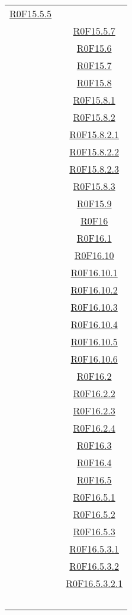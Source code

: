 \documentclass[../AnalisiDeiRequisiti.tex]{subfiles}
\begin{document}
\begin{longtable}{|c|c|}
	\hyperlink{R0F15.5.5}{R0F15.5.5}\\& \
	\hyperlink{R0F15.5.7}{R0F15.5.7}\\& \
	\hyperlink{R0F15.6}{R0F15.6}\\& \
	\hyperlink{R0F15.7}{R0F15.7}\\& \
	\hyperlink{R0F15.8}{R0F15.8}\\& \
	\hyperlink{R0F15.8.1}{R0F15.8.1}\\& \
	\hyperlink{R0F15.8.2}{R0F15.8.2}\\& \
	\hyperlink{R0F15.8.2.1}{R0F15.8.2.1}\\& \
	\hyperlink{R0F15.8.2.2}{R0F15.8.2.2}\\& \
	\hyperlink{R0F15.8.2.3}{R0F15.8.2.3}\\& \
	\hyperlink{R0F15.8.3}{R0F15.8.3}\\& \
	\hyperlink{R0F15.9}{R0F15.9}\\& \
	\hyperlink{R0F16}{R0F16}\\& \
	\hyperlink{R0F16.1}{R0F16.1}\\& \
	\hyperlink{R0F16.10}{R0F16.10}\\& \
	\hyperlink{R0F16.10.1}{R0F16.10.1}\\& \
	\hyperlink{R0F16.10.2}{R0F16.10.2}\\& \
	\hyperlink{R0F16.10.3}{R0F16.10.3}\\& \
	\hyperlink{R0F16.10.4}{R0F16.10.4}\\& \
	\hyperlink{R0F16.10.5}{R0F16.10.5}\\& \
	\hyperlink{R0F16.10.6}{R0F16.10.6}\\& \
	\hyperlink{R0F16.2}{R0F16.2}\\& \
	\hyperlink{R0F16.2.2}{R0F16.2.2}\\& \
	\hyperlink{R0F16.2.3}{R0F16.2.3}\\& \
	\hyperlink{R0F16.2.4}{R0F16.2.4}\\& \
	\hyperlink{R0F16.3}{R0F16.3}\\& \
	\hyperlink{R0F16.4}{R0F16.4}\\& \
	\hyperlink{R0F16.5}{R0F16.5}\\& \
	\hyperlink{R0F16.5.1}{R0F16.5.1}\\& \
	\hyperlink{R0F16.5.2}{R0F16.5.2}\\& \
	\hyperlink{R0F16.5.3}{R0F16.5.3}\\& \
	\hyperlink{R0F16.5.3.1}{R0F16.5.3.1}\\& \
	\hyperlink{R0F16.5.3.2}{R0F16.5.3.2}\\& \
	\hyperlink{R0F16.5.3.2.1}{R0F16.5.3.2.1}\\& \

\end{longtable}
\end{document}
